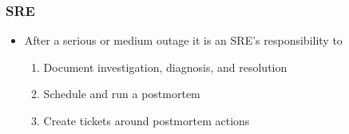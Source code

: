 \documentclass[]{beamer}
\begin{document}
\begin{frame}
  \frametitle{SRE}

  \begin{itemize}[<+->]
  \item After a serious or medium outage it is an SRE's responsibility to
    \begin{enumerate}
    \item Document investigation, diagnosis, and resolution
    \item Schedule and run a postmortem
    \item Create tickets around postmortem actions
    \end{enumerate}

  \end{itemize}

\end{frame}
\end{document}
